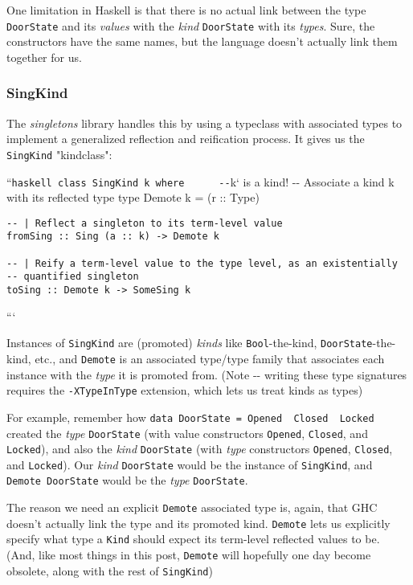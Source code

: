 \documentclass[]{article}
\begin{document}
One limitation in Haskell is that there is no actual link between the type
\texttt{DoorState} and its \emph{values} with the \emph{kind} \texttt{DoorState}
with its \emph{types}. Sure, the constructors have the same names, but the
language doesn't actually link them together for us.

\subsubsection{SingKind}

The \emph{singletons} library handles this by using a typeclass with associated
types to implement a generalized reflection and reification process. It gives us
the \texttt{SingKind} "kindclass":

``\texttt{haskell\ class\ SingKind\ k\ where\ \ \ \ \ \ -\/-}k` is a kind! -\/-
\textbar{} Associate a kind k with its reflected type type Demote k = (r ::
Type)

\begin{verbatim}
-- | Reflect a singleton to its term-level value
fromSing :: Sing (a :: k) -> Demote k

-- | Reify a term-level value to the type level, as an existentially
-- quantified singleton
toSing :: Demote k -> SomeSing k
\end{verbatim}

```

Instances of \texttt{SingKind} are (promoted) \emph{kinds} like
\texttt{Bool}-the-kind, \texttt{DoorState}-the-kind, etc., and \texttt{Demote}
is an associated type/type family that associates each instance with the
\emph{type} it is promoted from. (Note -\/- writing these type signatures
requires the \texttt{-XTypeInType} extension, which lets us treat kinds as
types)

For example, remember how
\texttt{data\ DoorState\ =\ Opened\ \textbar{}\ Closed\ \textbar{}\ Locked}
created the \emph{type} \texttt{DoorState} (with value constructors
\texttt{Opened}, \texttt{Closed}, and \texttt{Locked}), and also the \emph{kind}
\texttt{DoorState} (with \emph{type} constructors
\texttt{\textquotesingle{}Opened}, \texttt{\textquotesingle{}Closed}, and
\texttt{\textquotesingle{}Locked}). Our \emph{kind} \texttt{DoorState} would be
the instance of \texttt{SingKind}, and \texttt{Demote\ DoorState} would be the
\emph{type} \texttt{DoorState}.

The reason we need an explicit \texttt{Demote} associated type is, again, that
GHC doesn't actually link the type and its promoted kind. \texttt{Demote} lets
us explicitly specify what type a \texttt{Kind} should expect its term-level
reflected values to be. (And, like most things in this post, \texttt{Demote}
will hopefully one day become obsolete, along with the rest of
\texttt{SingKind})
\end{document}
